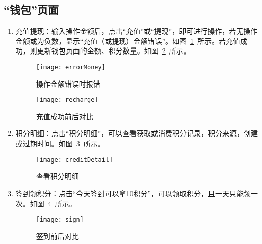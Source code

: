 \subsection{“钱包”页面}
\begin{enumerate}
\item {充值提现}：输入操作金额后，点击“充值”或“提现”，即可进行操作，若无操作金额或为负数，显示“充值（或提现）金额错误”。如图~\ref{fig:errorMoney}~所示。若充值成功，则更新钱包页面的金额、积分数量。如图~\ref{fig:recharge}~所示。
\begin{figure}[htbp]
    \centering
    \texttt{[image: errorMoney]}
    \caption{操作金额错误时报错}\label{fig:errorMoney}
\end{figure}
\begin{figure}[htbp]
    \centering
    \texttt{[image: recharge]}
    \caption{充值成功前后对比}\label{fig:recharge}
\end{figure} 
\item {积分明细}：点击“积分明细”，可以查看获取或消费积分记录，积分来源，创建或过期时间。如图~\ref{fig:creditDetail}~所示。
\begin{figure}[htbp]
    \centering
    \texttt{[image: creditDetail]}
    \caption{查看积分明细}\label{fig:creditDetail}
\end{figure} 
\item {签到领积分}：点击“今天签到可以拿10积分”，可以领取积分，且一天只能领一次。如图~\ref{fig:sign}~所示。
\begin{figure}[htbp]
    \centering
    \texttt{[image: sign]}
    \caption{签到前后对比}\label{fig:sign}
\end{figure} 
\end{enumerate}


